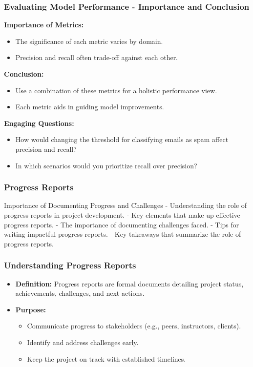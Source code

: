 \documentclass[aspectratio=169]{beamer}
\begin{document}
\begin{frame}[fragile]
    \frametitle{Evaluating Model Performance - Importance and Conclusion}
    \textbf{Importance of Metrics:}
    \begin{itemize}
        \item The significance of each metric varies by domain.
        \item Precision and recall often trade-off against each other.
    \end{itemize}
    
    \textbf{Conclusion:}
    \begin{itemize}
        \item Use a combination of these metrics for a holistic performance view.
        \item Each metric aids in guiding model improvements.
    \end{itemize}
    
    \textbf{Engaging Questions:}
    \begin{itemize}
        \item How would changing the threshold for classifying emails as spam affect precision and recall?
        \item In which scenarios would you prioritize recall over precision?
    \end{itemize}
\end{frame}

\begin{frame}[fragile]
    \frametitle{Progress Reports}
    \begin{block}{Importance of Documenting Progress and Challenges}
        - Understanding the role of progress reports in project development.
        - Key elements that make up effective progress reports.
        - The importance of documenting challenges faced.
        - Tips for writing impactful progress reports.
        - Key takeaways that summarize the role of progress reports.
    \end{block}
\end{frame}

\begin{frame}[fragile]
    \frametitle{Understanding Progress Reports}
    \begin{itemize}
        \item \textbf{Definition:} 
        Progress reports are formal documents detailing project status, achievements, challenges, and next actions.
        \item \textbf{Purpose:} 
        \begin{itemize}
            \item Communicate progress to stakeholders (e.g., peers, instructors, clients).
            \item Identify and address challenges early.
            \item Keep the project on track with established timelines.
        \end{itemize}
    \end{itemize}
\end{frame}
\end{document}
